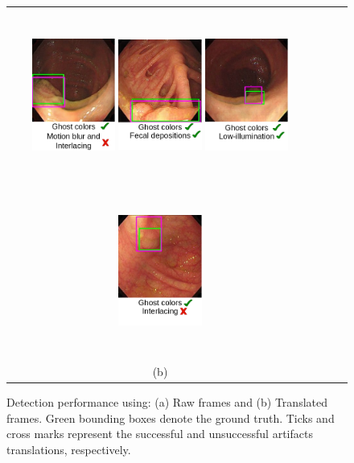 \documentclass[letterpaper]{article} %
\begin{document}
\begin{figure}
{\begin{tabular}{cccc}
          \includegraphics[width=0.28\textwidth,height=160pt]{dia1.png}  \hfill
          \includegraphics[width=0.28\textwidth,height=160pt]{dia2.png}  \hfill
          \includegraphics[width=0.28\textwidth,height=160pt]{dia3.png} \hfill
          \includegraphics[width=0.28\textwidth,height=160pt]{dia4.png} \\
           (b)



    \end{tabular}
    }
     \caption{ Detection performance using: (a) Raw frames and (b) Translated frames. Green bounding boxes denote the ground truth. Ticks and cross marks represent the successful and unsuccessful artifacts translations, respectively.
     }
      \label{fig:sample_res}

\end{figure}
\end{document}
